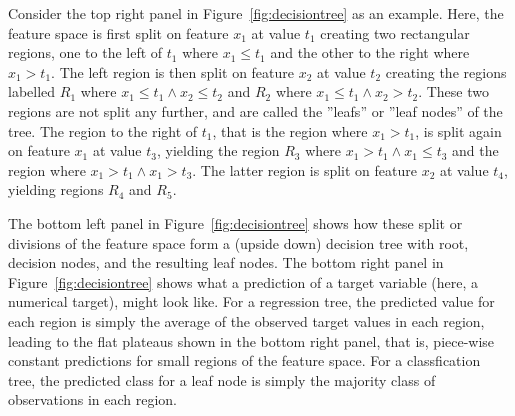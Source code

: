 Consider the top right panel in Figure~\ref{fig:decisiontree} as an example. Here, the feature space is first split on feature $x_1$ at value $t_1$ creating two rectangular regions, one to the left of $t_1$ where $x_1 \leq t_1$ and the other to the right where $x_1 > t_1$. The left region is then split on feature $x_2$ at value $t_2$ creating the regions labelled $R_1$ where $x_1 \leq t_1 \wedge x_2 \leq t_2$ and $R_2$ where $x_1 \leq t_1 \wedge x_2 > t_2$. These two regions are not split any further, and are called the ''leafs'' or ''leaf nodes'' of the tree. The region to the right of $t_1$, that is the region where $x_1 > t_1$, is split again on feature $x_1$ at value $t_3$, yielding the region $R_3$ where $x_1 > t_1 \wedge x_1 \leq t_3$ and the region where $x_1 > t_1 \wedge x_1 > t_3$. The latter region is split on feature $x_2$ at value $t_4$, yielding regions $R_4$ and $R_5$. 

The bottom left panel in Figure~\ref{fig:decisiontree} shows how these split or divisions of the feature space form a (upside down) decision tree with root, decision nodes, and the resulting leaf nodes. The bottom right panel in Figure~\ref{fig:decisiontree} shows what a prediction of a target variable (here, a numerical target), might look like. For a regression tree, the predicted value for each region is simply the average of the observed target values in each region, leading to the flat plateaus shown in the bottom right panel, that is, piece-wise constant predictions for small regions of the feature space. For a classfication tree, the predicted class for a leaf node is simply the majority class of observations in each region. 

